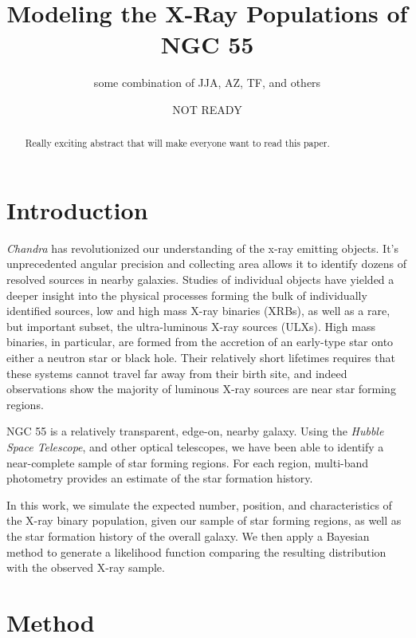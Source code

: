 \documentclass[12pt, preprint]{aastex}
\begin{document}
\title{Modeling the X-Ray Populations of NGC 55}
\author{some combination of JJA, AZ, TF, and others}
\date{NOT READY}

\begin{abstract}
Really exciting abstract that will make everyone want to read this paper.
\end{abstract}

\section{Introduction}

{\it Chandra} has revolutionized our understanding of the x-ray emitting objects. It's unprecedented angular precision and collecting area allows it to identify dozens of resolved sources in nearby galaxies. Studies of individual objects have yielded a deeper insight into the physical processes forming the bulk of individually identified sources, low and high mass X-ray binaries (XRBs), as well as a rare, but important subset, the ultra-luminous X-ray sources (ULXs). High mass binaries, in particular, are formed from the accretion of an early-type star onto either a neutron star or black hole. Their relatively short lifetimes requires that these systems cannot travel far away from their birth site, and indeed observations show the majority of luminous X-ray sources are near star forming regions. 

NGC 55 is a relatively transparent, edge-on, nearby galaxy. Using the {\it Hubble Space Telescope}, and other optical telescopes, we have been able to identify a near-complete sample of star forming regions. For each region, multi-band photometry provides an estimate of the star formation history. 

In this work, we simulate the expected number, position, and characteristics of the X-ray binary population, given our sample of star forming regions, as well as the star formation history of the overall galaxy. We then apply a Bayesian method to generate a likelihood function comparing the resulting distribution with the observed X-ray sample.

\section{Method}
\end{document}
